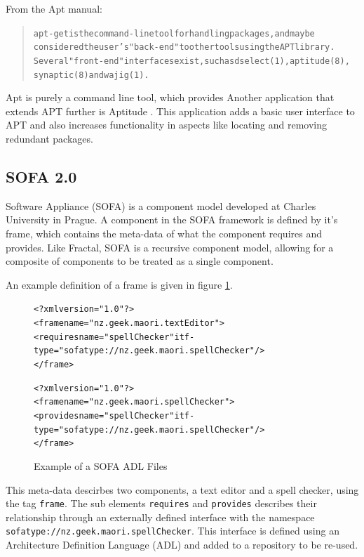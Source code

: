 From the Apt manual:
\begin{quotation}
\begin{alltt}
apt-get is the command-line tool for handling packages, and may be
       considered the user's "back-end" to other tools using the APT library.
       Several "front-end" interfaces exist, such as dselect(1), aptitude(8),
       synaptic(8) and wajig(1).
 \end{alltt}
\end{quotation}

Apt is purely a command line tool, which provides 
Another application that extends APT further is Aptitude \cite{Burrows2005}.
This application adds a basic user interface to APT and also increases functionality in aspects like locating and removing redundant packages. 


\subsection{SOFA 2.0}
Software Appliance (SOFA) is a component model developed at Charles University in Prague.
A component in the SOFA framework is defined by it's frame, which contains the meta-data of what the component requires and provides.
Like Fractal, SOFA is a recursive component model, allowing for a composite of components to be treated as a single component.

An example definition of a frame is given in figure \ref{SOFAmetadata}.

\begin{figure}[htp] 
\begin{center}
\begin{alltt}
<?xml version="1.0"?>
<frame name="nz.geek.maori.textEditor">
  <requires name="spellChecker" itf-type="sofatype://nz.geek.maori.spellChecker"/>
</frame>

<?xml version="1.0"?>
<frame name="nz.geek.maori.spellChecker">
  <provides name="spellChecker" itf-type="sofatype://nz.geek.maori.spellChecker"/>
</frame>
\end{alltt}
  \caption[SOFA ADL files]{Example of a SOFA ADL Files}
  \label{SOFAmetadata}
\end{center}
\end{figure}

This meta-data descirbes two components, a text editor and a spell checker, using the tag \verb+frame+.
The sub elements \verb+requires+ and \verb+provides+ describes their relationship through an externally defined interface with the namespace \verb+sofatype://nz.geek.maori.spellChecker+.
This interface is defined using an Architecture Definition Language (ADL) and added to a repository to be re-used. 


